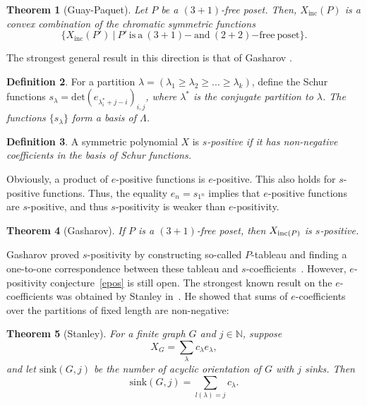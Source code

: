 \documentclass{article}
\theoremstyle{plain}
\newtheorem{thm}{Theorem}[section]
\theoremstyle{definition}
\newtheorem{defn}[thm]{Definition}
\begin{document}
\begin{thm}[Guay-Paquet]\label{G_P}
  Let $P$ be a $(3+1)$-free poset. Then, $X_\mathrm{inc}(P)$ is a
  convex combination of the chromatic symmetric
  functions $$\{X_\mathrm{inc}(P')\ |\ P'\ \mathrm{is}\ \mathrm{a}\
  (3+1)\mathrm{-}\ \mathrm{and}\ (2+2)\mathrm{-free}\ \mathrm{poset}
  \}.$$

\end{thm}


The strongest general result in this direction is that of Gasharov
\cite{Gasharov94}.

\begin{defn} \label{sfunc} For a partition $\lambda = (\lambda_1\geq
  \lambda_2\geq...\geq\lambda_k)$, define the Schur
  functions \em $s_{\lambda}=\mathrm{det}(e_{\lambda_i^*+j-i})_{i,j}$,
  \normalfont where $\lambda^*$ is the conjugate partition to
  $\lambda$. The functions $\{ s_{\lambda}\}$ form a basis of
  $\Lambda$.
\end{defn}


\begin{defn} \label{spos}
A symmetric polynomial $X$ is \em $s$-positive \normalfont if it has non-negative coefficients in the basis of Schur functions.
\end{defn}

Obviously, a product of $e$-positive functions is $e$-positive. This also holds for $s$-positive functions. Thus, the equality $e_n=s_{1^n}$ implies that $e$-positive functions are $s$-positive, and thus $s$-positivity is weaker than $e$-positivity.

\begin{thm}[Gasharov] \label{sposthm} 
If $P$ is a $(3+1)$-free poset, then $X_{\textnormal{inc}(P)}$ is $s$-positive.
\end{thm}

Gasharov proved $s$-positivity by  constructing so-called $P$-tableau and finding a one-to-one correspondence between these tableau and $s$-coefficients~\cite{Gasharov94}. However, $e$-positivity conjecture~\ref{epos} is still open. 
The strongest known result on the $e$-coefficients was obtained by Stanley in~\cite{Stanley95a}. He showed that sums of $e$-coefficients over the partitions of fixed length are non-negative:

\begin{thm}[Stanley]
For a finite graph $G$ and $j\in\mathbb{N}$, suppose $$X_G=\sum\limits_{\lambda}c_{\lambda}e_\lambda,$$
and let $\text{sink}(G,j)$ be the number of acyclic orientation of $G$ with $j$ sinks. Then
$$\text{sink}(G,j)=\sum\limits_{l(\lambda)=j}c_{\lambda}.$$
\end{thm}
\end{document}
